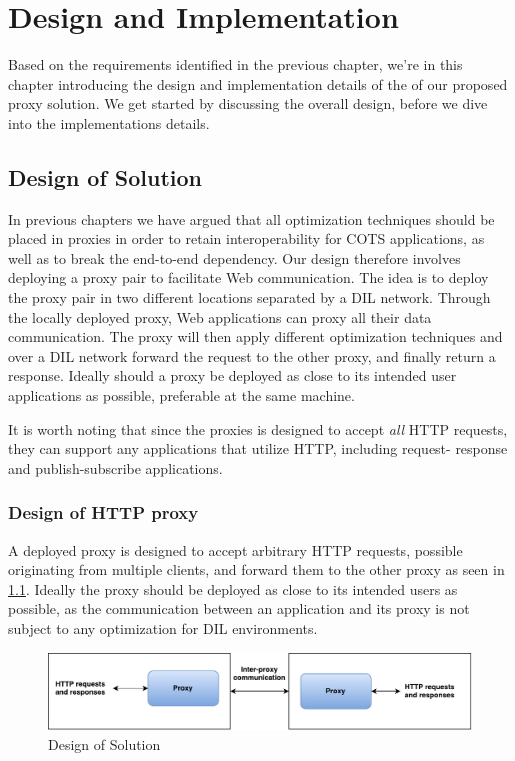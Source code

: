 \chapter{Design and Implementation}
\label{chapter:design}

Based on the requirements identified in the previous chapter, we're in this chapter introducing the design and implementation details of the of our proposed proxy solution. We get started by discussing the overall design, before we dive into the implementations details.



\section{Design of Solution}

In previous chapters we have argued that all optimization techniques should be
placed in proxies in order to retain interoperability for COTS applications, as
well as to break the end-to-end dependency. Our design therefore involves deploying a
proxy pair to facilitate Web communication. The idea is to deploy the proxy pair
in two different locations separated by a DIL network. Through the locally
deployed proxy, Web applications can proxy all their data communication. The
proxy will then apply different optimization techniques and over a DIL
network forward the request to the other proxy, and finally return a response.
Ideally should a proxy be deployed as close to its intended user applications as
possible, preferable at the same machine.


It is worth noting that since the proxies is designed to accept \textit{all} HTTP
requests, they can support any applications that utilize HTTP, including request-
response and publish-subscribe applications.


\subsection{Design of HTTP proxy}

A deployed proxy is designed to accept arbitrary HTTP requests, possible originating from
multiple clients, and forward them to the other proxy as seen in
\cref{figure:proxy_design}. Ideally the proxy should be deployed as close to its
intended users as possible, as the communication between an application and its
proxy is not subject to any optimization for DIL environments.

\begin{figure}[h]
\includegraphics[scale=0.55]{images/proxy_design.pdf}
\caption{Design of Solution}
\label{figure:proxy_design}
\end{figure}

